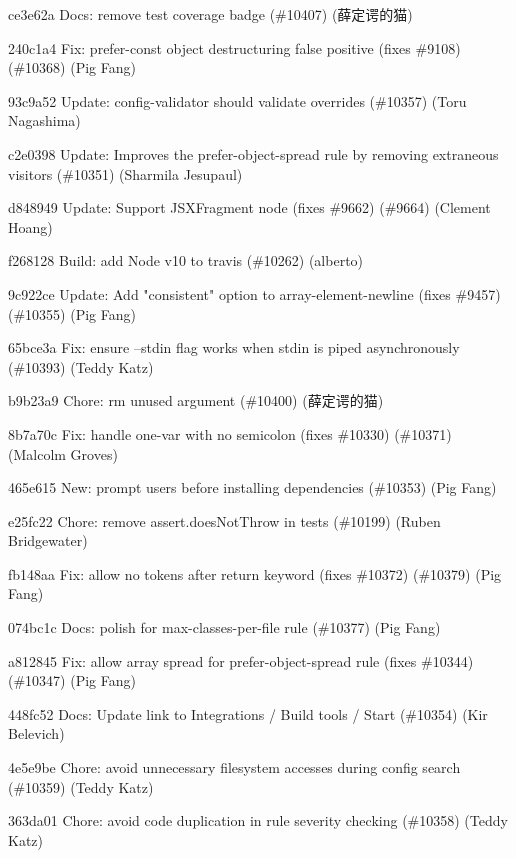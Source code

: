 \begin{DoxyItemize}
\item ce3e62a Docs\+: remove test coverage badge (\#10407) (薛定谔的猫)
\item 240c1a4 Fix\+: prefer-\/const object destructuring false positive (fixes \#9108) (\#10368) (Pig Fang)
\item 93c9a52 Update\+: config-\/validator should validate overrides (\#10357) (Toru Nagashima)
\item c2e0398 Update\+: Improves the prefer-\/object-\/spread rule by removing extraneous visitors (\#10351) (Sharmila Jesupaul)
\item d848949 Update\+: Support JSXFragment node (fixes \#9662) (\#9664) (Clement Hoang)
\item f268128 Build\+: add Node v10 to travis (\#10262) (alberto)
\item 9c922ce Update\+: Add "{}consistent"{} option to array-\/element-\/newline (fixes \#9457) (\#10355) (Pig Fang)
\item 65bce3a Fix\+: ensure --stdin flag works when stdin is piped asynchronously (\#10393) (Teddy Katz)
\item b9b23a9 Chore\+: rm unused argument (\#10400) (薛定谔的猫)
\item 8b7a70c Fix\+: handle one-\/var with no semicolon (fixes \#10330) (\#10371) (Malcolm Groves)
\item 465e615 New\+: prompt users before installing dependencies (\#10353) (Pig Fang)
\item e25fc22 Chore\+: remove assert.\+does\+Not\+Throw in tests (\#10199) (Ruben Bridgewater)
\item fb148aa Fix\+: allow no tokens after {\ttfamily return} keyword (fixes \#10372) (\#10379) (Pig Fang)
\item 074bc1c Docs\+: polish for max-\/classes-\/per-\/file rule (\#10377) (Pig Fang)
\item a812845 Fix\+: allow array spread for prefer-\/object-\/spread rule (fixes \#10344) (\#10347) (Pig Fang)
\item 448fc52 Docs\+: Update link to Integrations / Build tools / Start (\#10354) (Kir Belevich)
\item 4e5e9be Chore\+: avoid unnecessary filesystem accesses during config search (\#10359) (Teddy Katz)
\item 363da01 Chore\+: avoid code duplication in rule severity checking (\#10358) (Teddy Katz)
\end{DoxyItemize}

